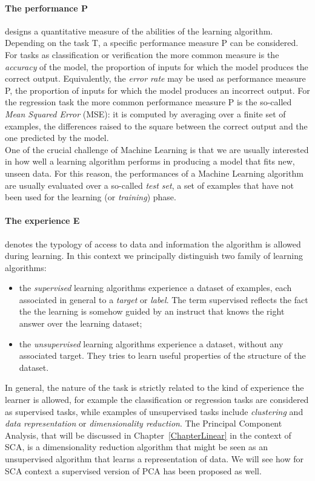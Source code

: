 \paragraph*{The performance P} designs a quantitative measure of the abilities of the learning algorithm. Depending on the task T, a specific performance measure P can be considered. For tasks as classification or verification the more common measure is the \emph{accuracy} of the model, \ie the proportion of inputs for which the model produces the correct output. Equivalently, the \emph{error rate} may be used as performance measure P, \ie the proportion of inputs for which the model produces an incorrect output. For the regression task the more common performance measure P is the so-called \emph{Mean Squared Error} (MSE): it is computed by averaging over a finite set of examples, the differences raised to the square between the correct output and the one predicted by the model. \\
One of the crucial challenge of Machine Learning is that we are usually interested in how well a learning algorithm performs in producing a model that fits new, unseen data. For this reason, the performances of a Machine Learning algorithm are usually evaluated over a so-called \emph{test set}, \ie a set of examples that have not been used for the learning (or \emph{training}) phase. 

\paragraph*{The experience E} denotes the typology of access to data and information the algorithm is allowed during learning. In this context we principally distinguish two family of learning algorithms: 
\begin{itemize}
\item the \emph{supervised} learning algorithms experience a dataset of examples, each associated in general to a \emph{target} or \emph{label}. The term supervised reflects the fact the the learning is somehow guided by an instruct that knows the right answer over the learning dataset;
\item the \emph{unsupervised} learning algorithms experience a dataset, without any associated target. They tries to learn useful properties of the structure of the dataset. 
\end{itemize}
In general, the nature of the task is strictly related to the kind of experience the learner is allowed, for example the classification or regression tasks are considered as supervised tasks, while examples of unsupervised tasks include \emph{clustering} and \emph{data representation} or \emph{dimensionality reduction}. The Principal Component Analysis, that will be discussed in Chapter~\ref{ChapterLinear} in the context of SCA, is a dimensionality reduction algorithm that might be seen as an unsupervised algorithm that learns a representation of data. We will see how for SCA context a supervised version of PCA has been proposed as well. 


